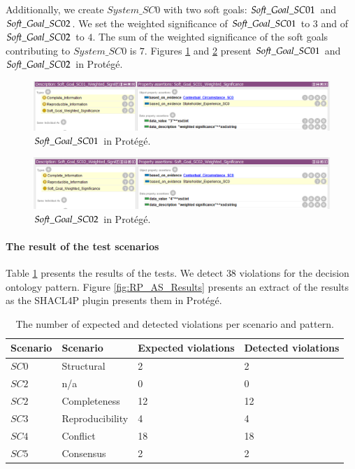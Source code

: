 Additionally, we create $System\_SC0$ with two soft goals: $So{\mkern-2mu f\mkern-3mu}t\_Goal\_SC01$ and $So{\mkern-2mu f\mkern-3mu}t\_Goal\_SC02$. We set the weighted significance of $So{\mkern-2mu f\mkern-3mu}t\_Goal\_SC01$ to $3$ and of $So{\mkern-2mu f\mkern-3mu}t\_Goal\_SC02$ to $4$. The sum of the weighted significance of the soft goals contributing to $System\_SC0$ is $7$. Figures \ref{fig:05_AS_SC0_SoftGoal_SC01} and \ref{fig:05_AS_SC0_SoftGoal_SC02} present $So{\mkern-2mu f\mkern-3mu}t\_Goal\_SC01$ and $So{\mkern-2mu f\mkern-3mu}t\_Goal\_SC02$ in Prot\'eg\'e.

\begin{figure}[H]
\centering
  \includegraphics[width=15cm]{../../Images/05_Validation/05_AS_SC0_SG_SC01.png}
  \caption{$So{\mkern-2mu f\mkern-3mu}t\_Goal\_SC01$ in Prot\'eg\'e.}
  \label{fig:05_AS_SC0_SoftGoal_SC01}
\end{figure}

\begin{figure}[H]
\centering
  \includegraphics[width=15cm]{../../Images/05_Validation/05_AS_SC0_SG_SC02.png}
  \caption{$So{\mkern-2mu f\mkern-3mu}t\_Goal\_SC02$ in Prot\'eg\'e.}
  \label{fig:05_AS_SC0_SoftGoal_SC02}
\end{figure}

\paragraph{The result of the test scenarios}
Table \ref{table:as_number_of_violations} presents the results of the tests. We detect $38$ violations for the decision ontology pattern. Figure \ref{fig:RP_AS_Results} presents an extract of the results as the SHACL4P plugin presents them in Prot\'eg\'e.

\begin{table}[H]
\centering
\caption{The number of expected and detected violations per scenario and pattern.}
\begin{tabular}{| p{3cm} | p{3cm} | p{4cm} | p{4cm} | }
\hline
\rowcolor{document}
\color{documentText}Scenario & \color{documentText}Scenario & \color{documentText}Expected violations & \color{documentText}Detected violations  \\
\hline
$SC0$ & Structural & 2 & 2 \\
\hdashline
$SC2$ & n/a & 0 & 0 \\
\hdashline
$SC2$ & Completeness & 12 & 12 \\
\hdashline
$SC3$ & Reproducibility & 4 & 4 \\
\hdashline
$SC4$ & Conflict & 18 & 18 \\
\hdashline
$SC5$ & Consensus & 2 & 2 \\
\hline
\end{tabular}
\label{table:as_number_of_violations}
\end{table}


